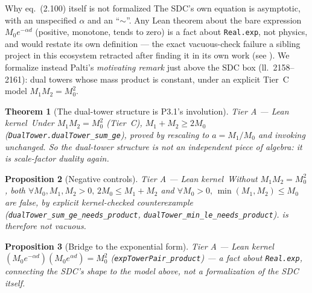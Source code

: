 \documentclass[11pt,a4paper]{article}
\newtheorem{theorem}{Theorem}[section]
\newtheorem{proposition}[theorem]{Proposition}
\theoremstyle{remark}
\newcommand{\tierA}{\colorbox{green!15}{\textsf{\scriptsize Tier A --- Lean kernel}}}
\begin{document}
\begin{casebox}{Why eq.~(2.100) itself is not formalized}
The SDC's own equation is asymptotic, with an unspecified $\alpha$ and an ``$\sim$''. Any Lean
theorem about the bare expression $M_0e^{-\alpha d}$ (positive, monotone, tends to zero) is a fact
about \texttt{Real.exp}, not physics, and would restate its own definition --- the exact vacuous-check
failure a sibling project in this ecosystem retracted after finding it in its own work (see
). We formalize instead Palti's \emph{motivating remark} just above the SDC box
(ll.~2158--2161): dual towers whose mass product is constant, under an explicit Tier~C model
$M_1M_2=M_0^2$.
\end{casebox}

\begin{theorem}[The dual-tower structure is P3.1's involution] \label{thm:towersum} \tierA\
Under $M_1M_2=M_0^2$ (Tier~C), $M_1+M_2\ge2M_0$
\textnormal{(}\texttt{DualTower.dualTower\_sum\_ge}\textnormal{)}, proved by rescaling to
$a=M_1/M_0$ and invoking \Cref{thm:sum} \emph{unchanged}. So the dual-tower structure is not an
independent piece of algebra: it is scale-factor duality again.
\end{theorem}

\begin{proposition}[Negative controls] \label{prop:negctrl} \tierA\
Without $M_1M_2=M_0^2$, both $\forall M_0,M_1,M_2{>}0,\,2M_0\le M_1{+}M_2$ and
$\forall M_0{>}0,\,\min(M_1,M_2)\le M_0$ are \emph{false}, by explicit kernel-checked
counterexample \textnormal{(}\texttt{dualTower\_sum\_ge\_needs\_product},
\texttt{dualTower\_min\_le\_needs\_product}\textnormal{)}. \Cref{thm:towersum} is therefore not
vacuous.
\end{proposition}

\begin{proposition}[Bridge to the exponential form] \label{prop:exptower} \tierA\
$(M_0e^{-\alpha d})(M_0e^{\alpha d})=M_0^2$ \textnormal{(}\texttt{expTowerPair\_product}\textnormal{)}
--- a fact about \texttt{Real.exp}, connecting the SDC's shape to the model above, not a
formalization of the SDC itself.
\end{proposition}

\end{document}
